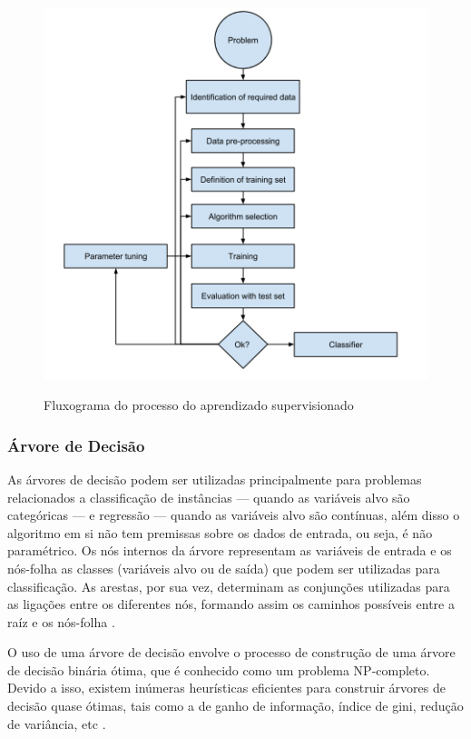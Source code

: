 \documentclass[
	12pt,				%
	oneside,			%
	a4paper,			%
	english,			%
	brazil				%
	]{abntex2ppgsi}
\begin{document}
\begin{figure}[H]%
	\centering
 	  \caption{Fluxograma do processo do aprendizado supervisionado}
		\includegraphics[width=0.8\linewidth]{images/ml_arch.png}
	\label{fig:arch_ml}
\end{figure}

\subsubsection{Árvore de Decisão}

As árvores de decisão podem ser utilizadas principalmente para problemas relacionados a classificação de instâncias --- quando as variáveis alvo são categóricas --- e regressão --- quando as variáveis alvo são contínuas, além disso o algoritmo em si não tem premissas sobre os dados de entrada, ou seja, é não paramétrico. Os nós internos da árvore representam as variáveis de entrada e os nós-folha as classes (variáveis alvo ou de saída) que podem ser utilizadas para classificação. As arestas, por sua vez, determinam as conjunções utilizadas para as ligações entre os diferentes nós, formando assim os caminhos possíveis entre a raíz e os nós-folha \cite{kotsiantis2007supervised}.

O uso de uma árvore de decisão envolve o processo de construção de uma árvore de decisão binária ótima, que é conhecido como um problema NP-completo. Devido a isso, existem inúmeras heurísticas eficientes para construir árvores de decisão quase ótimas, tais como a de ganho de informação, índice de gini, redução de variância, etc \cite{kotsiantis2007supervised}. 
\end{document}
